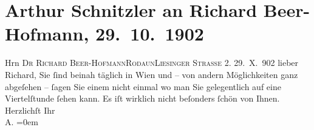 

         
         \renewcommand{\erwaehntePersonen}{Personen: Richard Beer-Hofmann}
         \renewcommand{\erwaehnteOrte}{Orte: I., Innere Stadt, Liesingerstraße, Rodaun, Wien}
         \renewcommand{\erwaehnteWerke}{}
               \section[Arthur Schnitzler an Richard Beer-Hofmann, 29. 10. 1902]{ Arthur Schnitzler an Richard Beer-Hofmann, 29. 10. 1902}\nopagebreak{}\rehead{ }\begin{ledgroupsized}[t]{13cm}\normalsize\beginnumbering \toendnotes[C]{\smallbreak\pagebreak[2]} 
\pstart{}{\pb}Hrn \textsc{Dr Richard Beer-Hofmann}\pend{}\pstart{}\textsc{Rodaun}\pend{}\pstart{}\textsc{Liesinger Straße 2.}\pend{}{\bigskip}\pstart
           \raggedleft{}{\pb}29. X. 902\pend
           \pstart
           lieber Richard, Sie ſind beinah täglich in Wien und – von andern Möglichkeiten ganz abgeſehen – ſagen Sie
               einem nicht einmal wo man Sie gelegentlich auf eine {\pb}Viertelſtunde ſehen kann. Es iſt wirklich nicht beſonders ſchön von Ihnen.\pend
           \pstart
           Herzlichſt Ihr{\\[\baselineskip]}\spacefill\mbox{A.}\pend
           \leftskip=0em{}
         
         \endnumbering{}\end{ledgroupsized}  \newcommand{\dateiname}{L01246}\newcommand{\titel}{Arthur Schnitzler an Richard Beer-Hofmann, 29. 10. 1902}\newcommand{\editorInnen}{Martin Anton Müller und Gerd-Hermann Susen}
      